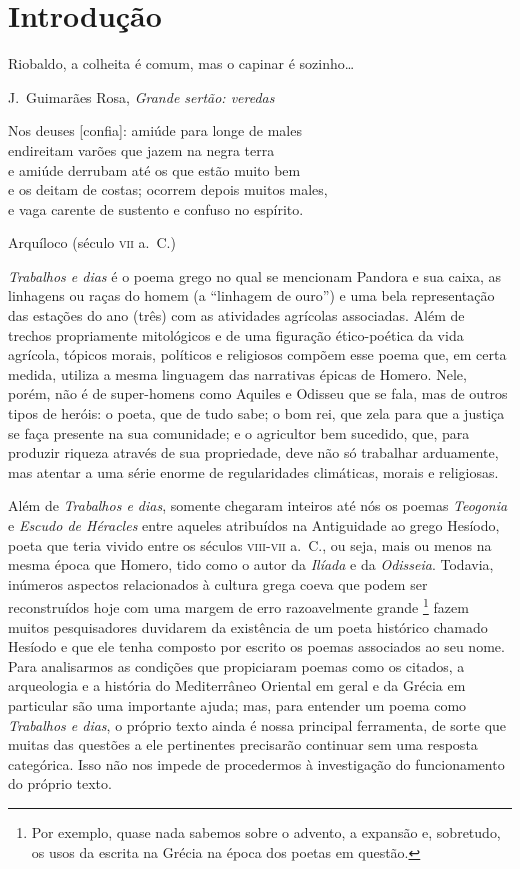 

\chapter[Introdução, por Christian Werner]{Introdução}  


\epigraph{Riobaldo, a colheita é comum,
mas o capinar é sozinho\ldots{}}{J.~Guimarães Rosa, \textit{Grande sertão: veredas}}

\epigraph{%
  Nos deuses [confia]: amiúde para longe de males\\
  endireitam varões que jazem na negra terra\\
  e amiúde derrubam até os que estão muito bem\\
  e os deitam de costas; ocorrem depois muitos males,\\
  e vaga carente de sustento e confuso no espírito.
}{Arquíloco (século \textsc{vii} a.~C.)}

\textit{Trabalhos e dias} é o poema grego no qual se mencionam Pandora e
sua caixa, as linhagens ou raças do homem (a “linhagem de ouro”) e uma
bela representação das estações do ano (três) com as atividades
agrícolas associadas. Além de trechos propriamente
mitológicos e de uma figuração ético-poética da vida agrícola, tópicos
morais, políticos e religiosos compõem esse poema que, em certa medida,
utiliza a mesma linguagem das narrativas épicas de Homero. Nele, porém,
não é de super-homens como Aquiles e Odisseu que se fala, mas de outros
tipos de heróis: o poeta, que de tudo sabe; o  bom rei, que zela para
que a justiça se faça presente na sua comunidade; e o agricultor bem
sucedido, que, para produzir riqueza através de sua propriedade, deve
não só trabalhar arduamente, mas atentar a uma série enorme de
regularidades climáticas, morais e religiosas.

Além de \textit{Trabalhos e dias}, somente chegaram inteiros até nós os
poemas \textit{Teogonia} e \textit{Escudo de Héracles} entre aqueles
atribuídos na Antiguidade ao grego Hesíodo, poeta que teria vivido
entre os séculos \textsc{viii}-\textsc{vii} a.~C., ou seja, mais ou menos 
na mesma época que Homero, tido como o autor da \textit{Ilíada} e da
\textit{Odisseia}. Todavia, inúmeros aspectos relacionados à cultura
grega coeva que podem ser reconstruídos hoje com uma margem de erro razoavelmente 
grande \footnote{ Por exemplo, quase nada sabemos sobre o advento, a expansão e, sobretudo, 
os usos da escrita na Grécia na época dos poetas em questão.} fazem muitos pesquisadores 
duvidarem da existência de um poeta histórico chamado Hesíodo e que ele tenha
composto por escrito os poemas associados ao seu nome. Para analisarmos
as condições que propiciaram poemas como os citados, a arqueologia e a
história do Mediterrâneo Oriental em geral e da Grécia em particular
são uma importante ajuda; mas, para entender um poema como
\textit{Trabalhos e dias}, o próprio texto ainda é nossa principal
ferramenta, de sorte que muitas das questões a ele pertinentes
precisarão continuar sem uma resposta categórica. Isso não nos impede de
procedermos à investigação do funcionamento do próprio texto.

